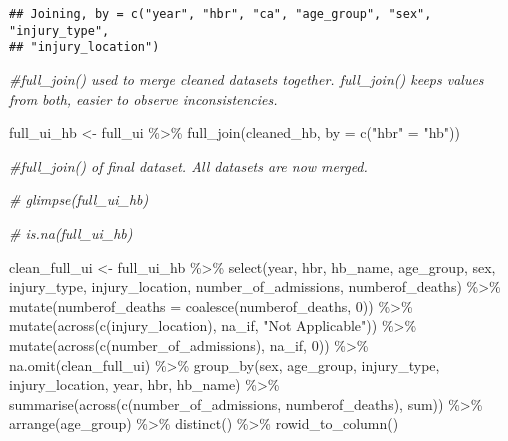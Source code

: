 \documentclass[
]{article}
\newenvironment{Shaded}{\begin{snugshade}}{\end{snugshade}}
\newcommand{\AttributeTok}[1]{\textcolor[rgb]{0.77,0.63,0.00}{#1}}
\newcommand{\CommentTok}[1]{\textcolor[rgb]{0.56,0.35,0.01}{\textit{#1}}}
\newcommand{\DecValTok}[1]{\textcolor[rgb]{0.00,0.00,0.81}{#1}}
\newcommand{\FunctionTok}[1]{\textcolor[rgb]{0.00,0.00,0.00}{#1}}
\newcommand{\NormalTok}[1]{#1}
\newcommand{\OtherTok}[1]{\textcolor[rgb]{0.56,0.35,0.01}{#1}}
\newcommand{\SpecialCharTok}[1]{\textcolor[rgb]{0.00,0.00,0.00}{#1}}
\newcommand{\StringTok}[1]{\textcolor[rgb]{0.31,0.60,0.02}{#1}}
\begin{document}
\begin{verbatim}
## Joining, by = c("year", "hbr", "ca", "age_group", "sex", "injury_type",
## "injury_location")
\end{verbatim}

\begin{Shaded}
\begin{Highlighting}[]
\CommentTok{\#full\_join() used to merge cleaned datasets together. full\_join() keeps values from both, easier to observe inconsistencies.}

\NormalTok{full\_ui\_hb }\OtherTok{\textless{}{-}}\NormalTok{ full\_ui }\SpecialCharTok{\%\textgreater{}\%} 
  \FunctionTok{full\_join}\NormalTok{(cleaned\_hb, }\AttributeTok{by =} \FunctionTok{c}\NormalTok{(}\StringTok{"hbr"} \OtherTok{=} \StringTok{"hb"}\NormalTok{))}

\CommentTok{\#full\_join() of final dataset. All datasets are now merged.}

\CommentTok{\# glimpse(full\_ui\_hb)}

\CommentTok{\# is.na(full\_ui\_hb)}


\NormalTok{clean\_full\_ui }\OtherTok{\textless{}{-}}\NormalTok{ full\_ui\_hb }\SpecialCharTok{\%\textgreater{}\%} 
  \FunctionTok{select}\NormalTok{(year,}
\NormalTok{      hbr,}
\NormalTok{      hb\_name,}
\NormalTok{      age\_group,}
\NormalTok{      sex,}
\NormalTok{      injury\_type,}
\NormalTok{      injury\_location,}
\NormalTok{      number\_of\_admissions,}
\NormalTok{      numberof\_deaths)  }\SpecialCharTok{\%\textgreater{}\%} 
  \FunctionTok{mutate}\NormalTok{(}\AttributeTok{numberof\_deaths =} \FunctionTok{coalesce}\NormalTok{(numberof\_deaths, }\DecValTok{0}\NormalTok{)) }\SpecialCharTok{\%\textgreater{}\%} 
  \FunctionTok{mutate}\NormalTok{(}\FunctionTok{across}\NormalTok{(}\FunctionTok{c}\NormalTok{(injury\_location), na\_if, }\StringTok{"Not Applicable"}\NormalTok{)) }\SpecialCharTok{\%\textgreater{}\%} 
  \FunctionTok{mutate}\NormalTok{(}\FunctionTok{across}\NormalTok{(}\FunctionTok{c}\NormalTok{(number\_of\_admissions), na\_if, }\DecValTok{0}\NormalTok{)) }\SpecialCharTok{\%\textgreater{}\%} 
  \FunctionTok{na.omit}\NormalTok{(clean\_full\_ui) }\SpecialCharTok{\%\textgreater{}\%} 
  \FunctionTok{group\_by}\NormalTok{(sex, age\_group, injury\_type, injury\_location, year, hbr, hb\_name) }\SpecialCharTok{\%\textgreater{}\%} 
  \FunctionTok{summarise}\NormalTok{(}\FunctionTok{across}\NormalTok{(}\FunctionTok{c}\NormalTok{(number\_of\_admissions, numberof\_deaths), sum)) }\SpecialCharTok{\%\textgreater{}\%} 
  \FunctionTok{arrange}\NormalTok{(age\_group) }\SpecialCharTok{\%\textgreater{}\%} 
  \FunctionTok{distinct}\NormalTok{() }\SpecialCharTok{\%\textgreater{}\%} 
  \FunctionTok{rowid\_to\_column}\NormalTok{()}
\end{Highlighting}
\end{Shaded}
\end{document}

